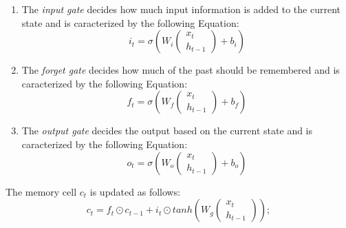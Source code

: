 \begin{enumerate}
    \item The \textit{input gate} decides how much input information is 
    added to the current state and is caracterized by the following Equation:
        \begin{equation}
            i_t = \sigma \left(
                W_i
                \begin{pmatrix}
                x_t \\
                h_{t-1}
                \end{pmatrix}
                + b_i
            \right)
        \end{equation}
    
    \item The \textit{forget gate} decides how much of the past should 
    be remembered and is caracterized by the following Equation:
        \begin{equation}
            f_t = \sigma \left(
                W_f
                \begin{pmatrix}
                x_t \\
                h_{t-1}
                \end{pmatrix}
                + b_f
            \right)
        \end{equation}

    \item The \textit{output gate} decides the output based on the current state and is caracterized by the following Equation:
        \begin{equation}
            o_t = \sigma \left(
                W_o
                \begin{pmatrix}
                x_t \\
                h_{t-1}
                \end{pmatrix}
                + b_o
            \right)
        \end{equation}

\end{enumerate}


The memory cell $c_t$ is updated as follows:
\begin{equation}
    c_t = f_t \odot c_{t-1} + i_t \odot tanh \left( W_g
        \begin{pmatrix}
            x_t \\
            h_{t-1}
        \end{pmatrix}
        \right) ;
\end{equation}

